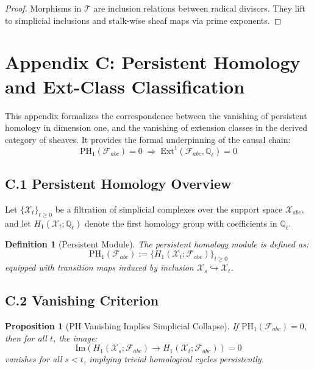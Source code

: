 \documentclass[11pt]{article}
\newtheorem{definition}[theorem]{Definition}
\newtheorem{proposition}[theorem]{Proposition}
\begin{document}
\begin{proof}
Morphisms in \( \mathcal{T} \) are inclusion relations between radical divisors.  
They lift to simplicial inclusions and stalk-wise sheaf maps via prime exponents.
\end{proof}



\section*{Appendix C: Persistent Homology and Ext-Class Classification}

This appendix formalizes the correspondence between the vanishing of persistent homology in dimension one,  
and the vanishing of extension classes in the derived category of sheaves.  
It provides the formal underpinning of the causal chain:
\[
\mathrm{PH}_1(\mathcal{F}_{abc}) = 0 \;\Rightarrow\; \mathrm{Ext}^1(\mathcal{F}_{abc}, \mathbb{Q}_\ell) = 0
\]

\subsection*{C.1 Persistent Homology Overview}

Let \( \{ \mathcal{X}_t \}_{t \geq 0} \) be a filtration of simplicial complexes over the support space \( \mathcal{X}_{abc} \),  
and let \( H_1(\mathcal{X}_t; \mathbb{Q}_\ell) \) denote the first homology group with coefficients in \( \mathbb{Q}_\ell \).

\begin{definition}[Persistent Module]
The persistent homology module is defined as:
\[
\mathrm{PH}_1(\mathcal{F}_{abc}) := \{ H_1(\mathcal{X}_t; \mathcal{F}_{abc}) \}_{t \geq 0}
\]
equipped with transition maps induced by inclusion \( \mathcal{X}_s \hookrightarrow \mathcal{X}_t \).
\end{definition}

\subsection*{C.2 Vanishing Criterion}

\begin{proposition}[PH Vanishing Implies Simplicial Collapse]
If \( \mathrm{PH}_1(\mathcal{F}_{abc}) = 0 \), then for all \( t \), the image:
\[
\mathrm{Im} \left( H_1(\mathcal{X}_s; \mathcal{F}_{abc}) \to H_1(\mathcal{X}_t; \mathcal{F}_{abc}) \right) = 0
\]
vanishes for all \( s < t \), implying trivial homological cycles persistently.
\end{proposition}
\end{document}

